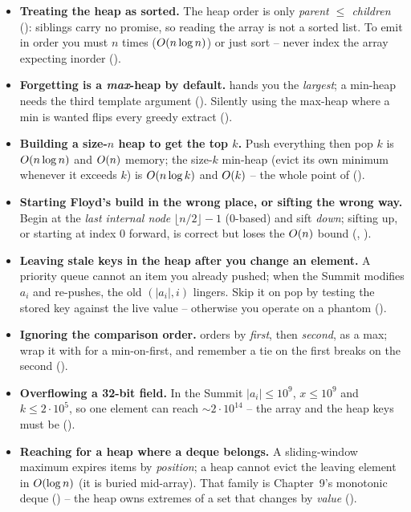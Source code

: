 \begin{itemize}[nosep, leftmargin=1.4em]
  \item \textbf{Treating the heap as sorted.} The heap order is only \emph{parent $\le$ children}
        (): siblings carry no promise, so reading the array is not a sorted list. To emit
        in order you must  $n$ times ($O(n\log n)$) or just sort -- never index the array
        expecting inorder ().
  \item \textbf{Forgetting  is a \emph{max}-heap by default.} 
        hands you the \emph{largest}; a min-heap needs the third template argument
         (). Silently using the max-heap where a min is wanted flips every
        greedy extract ().
  \item \textbf{Building a size-$n$ heap to get the top $k$.} Push everything then pop $k$ is $O(n\log
        n)$ and $O(n)$ memory; the size-$k$ min-heap (evict its own minimum whenever it exceeds $k$) is
        $O(n\log k)$ and $O(k)$ -- the whole point of  ().
  \item \textbf{Starting Floyd's build in the wrong place, or sifting the wrong way.} Begin at the
        \emph{last internal node} $\lfloor n/2\rfloor-1$ (0-based) and sift \emph{down}; sifting up, or
        starting at index $0$ forward, is correct but loses the $O(n)$ bound (,
        ).
  \item \textbf{Leaving stale keys in the heap after you change an element.} A priority queue cannot
         an item you already pushed; when the Summit modifies $a_i$ and re-pushes, the old
        $(|a_i|,i)$ lingers. Skip it on pop by testing the stored key against the live value -- otherwise you
        operate on a phantom ().
  \item \textbf{Ignoring the  comparison order.}  orders by
        \emph{first}, then \emph{second}, as a max; wrap it with  for a min-on-first, and
        remember a tie on the first breaks on the second ().
  \item \textbf{Overflowing a 32-bit field.} In the Summit $|a_i|\le 10^{9}$, $x\le 10^{9}$ and $k\le
        2\cdot10^{5}$, so one element can reach $\sim2\cdot10^{14}$ -- the array and the heap keys must be
         ().
  \item \textbf{Reaching for a heap where a deque belongs.} A sliding-window maximum expires items by
        \emph{position}; a heap cannot evict the leaving element in $O(\log n)$ (it is buried mid-array).
        That family is Chapter~9's monotonic deque () -- the heap owns extremes of a set that
        changes by \emph{value} ().
\end{itemize}

